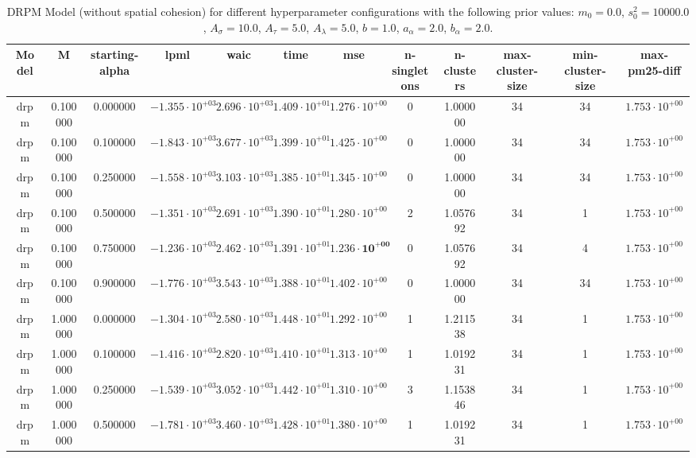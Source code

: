 \begin{table}
\caption{DRPM Model (without spatial cohesion) for different hyperparameter configurations with the following prior values: $m_0 = 0.0$, $s_0^2 = 10000.0$, $A_\sigma = 10.0$, $A_\tau = 5.0$, $A_\lambda = 5.0$, $b = 1.0$, $a_\alpha = 2.0$, $b_\alpha = 2.0$.}
\centering\begin{tabular}{cccccccccccc}
\toprule
Model & M & starting-alpha & lpml & waic & time & mse & n-singletons & n-clusters & max-cluster-size & min-cluster-size & max-pm25-diff \\
\midrule
drpm & 0.100000 & 0.000000 & $-1.355 \cdot 10^{+03}$ & $2.696 \cdot 10^{+03}$ & $1.409 \cdot 10^{+01}$ & $1.276 \cdot 10^{+00}$ & 0 & 1.000000 & 34 & 34 & $1.753 \cdot 10^{+00}$ \\
drpm & 0.100000 & 0.100000 & $-1.843 \cdot 10^{+03}$ & $3.677 \cdot 10^{+03}$ & $1.399 \cdot 10^{+01}$ & $1.425 \cdot 10^{+00}$ & 0 & 1.000000 & 34 & 34 & $1.753 \cdot 10^{+00}$ \\
drpm & 0.100000 & 0.250000 & $-1.558 \cdot 10^{+03}$ & $3.103 \cdot 10^{+03}$ & $1.385 \cdot 10^{+01}$ & $1.345 \cdot 10^{+00}$ & 0 & 1.000000 & 34 & 34 & $1.753 \cdot 10^{+00}$ \\
drpm & 0.100000 & 0.500000 & $-1.351 \cdot 10^{+03}$ & $2.691 \cdot 10^{+03}$ & $1.390 \cdot 10^{+01}$ & $1.280 \cdot 10^{+00}$ & 2 & 1.057692 & 34 & 1 & $1.753 \cdot 10^{+00}$ \\
drpm & 0.100000 & 0.750000 & $-1.236 \cdot 10^{+03}$ & $2.462 \cdot 10^{+03}$ & $1.391 \cdot 10^{+01}$ & $\mathbf{1.236 \cdot 10^{+00}}$ & 0 & 1.057692 & 34 & 4 & $1.753 \cdot 10^{+00}$ \\
drpm & 0.100000 & 0.900000 & $-1.776 \cdot 10^{+03}$ & $3.543 \cdot 10^{+03}$ & $1.388 \cdot 10^{+01}$ & $1.402 \cdot 10^{+00}$ & 0 & 1.000000 & 34 & 34 & $1.753 \cdot 10^{+00}$ \\
drpm & 1.000000 & 0.000000 & $-1.304 \cdot 10^{+03}$ & $2.580 \cdot 10^{+03}$ & $1.448 \cdot 10^{+01}$ & $1.292 \cdot 10^{+00}$ & 1 & 1.211538 & 34 & 1 & $1.753 \cdot 10^{+00}$ \\
drpm & 1.000000 & 0.100000 & $-1.416 \cdot 10^{+03}$ & $2.820 \cdot 10^{+03}$ & $1.410 \cdot 10^{+01}$ & $1.313 \cdot 10^{+00}$ & 1 & 1.019231 & 34 & 1 & $1.753 \cdot 10^{+00}$ \\
drpm & 1.000000 & 0.250000 & $-1.539 \cdot 10^{+03}$ & $3.052 \cdot 10^{+03}$ & $1.442 \cdot 10^{+01}$ & $1.310 \cdot 10^{+00}$ & 3 & 1.153846 & 34 & 1 & $1.753 \cdot 10^{+00}$ \\
drpm & 1.000000 & 0.500000 & $-1.781 \cdot 10^{+03}$ & $3.460 \cdot 10^{+03}$ & $1.428 \cdot 10^{+01}$ & $1.380 \cdot 10^{+00}$ & 1 & 1.019231 & 34 & 1 & $1.753 \cdot 10^{+00}$ \\

\end{tabular}
\end{table}
